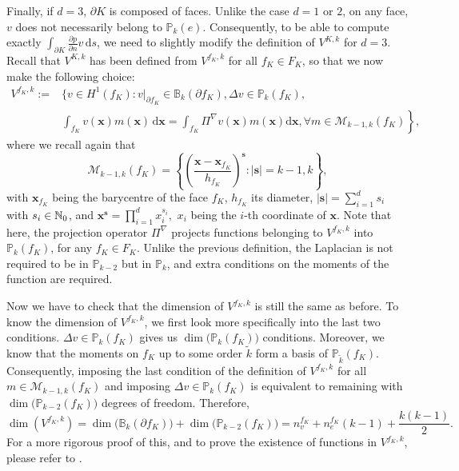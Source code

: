 Finally, if $d=3$, $\partial K$ is composed of faces. Unlike the case $d=1$ or $2$, on any face, $v$ does not necessarily belong to $\mathbb{P}_k(e)$. Consequently, to be able to compute exactly $\int_{\partial K} \frac{\partial p}{\partial n} v \, \mathrm{d}s$, we need to  slightly modify the definition of $V^{K,k}$ for $d=3$. Recall that $V^{K,k}$ has been defined from $V^{f_K,k}$ for all $f_K\in F_K$, so that we now make the following choice:
\begin{align*}
V^{f_K,k} := &\Bigg\{v\in H^1(f_K) : v|_{\partial f_K} \in \mathbb{B}_k(\partial f_K), \Delta v\in \mathbb{P}_{k}(f_K), \\
&\left. \int_{f_K} v(\mathbf{x}) m(\mathbf{x}) \, \mathrm{d}\mathbf{x} = \int_{f_K} \Pi^\nabla v(\mathbf{x}) m(\mathbf{x})\mathrm{d}\mathbf{x}, \forall m\in\mathcal{M}_{k-1,k}(f_K) \right\},
\end{align*}
where we recall again that $$\mathcal{M}_{k-1,k}(f_K) = \left\{\left(\frac{\mathbf{x}- \mathbf{x}_{f_K}}{h_{f_K}}\right)^\mathbf{s} : |\mathbf{s}|= k-1, k\right\},$$ with $\mathbf{x}_{f_K}$ being the barycentre of the face $f_K$, $h_{f_K}$ its diameter, $|\mathbf{s}| = \sum_{i=1}^d s_i$ with $s_i\in \mathbb{N}_0$, and $\mathbf{x}^\mathbf{s}=\prod_{i=1}^d x_i^{s_i},$ $x_i$ being the $i$-th coordinate of $\mathbf{x}$. Note that here, the projection operator $\Pi^\nabla$ projects functions belonging to $V^{f_K,k}$ into $\mathbb{P}_k(f_K)$, for any $f_K\in F_K$. 
Unlike the previous definition, the Laplacian is not required to be in $\mathbb{P}_{k-2}$ but in $\mathbb{P}_k$, and extra conditions on the moments of the function are required.

Now we have to check that the dimension of $V^{f_K,k}$ is still the same as before. 
To know the dimension of $V^{f_K,k}$, we first look more specifically into the last two conditions. $\Delta v\in\mathbb{P}_k(f_K)$ gives us $\dim\big(\mathbb{P}_k(f_K)\big)$ conditions. Moreover, we know that the moments on $f_K$ up to some order $\tilde{k}$ form a basis of $\mathbb{P}_{\tilde{k}}(f_K)$. Consequently, imposing the last condition of the definition of $V^{f_K,k}$ for all $m\in\mathcal{M}_{k-1,k}(f_K)$ and imposing $\Delta v\in\mathbb{P}_k(f_K)$ is equivalent to remaining with $\dim\big(\mathbb{P}_{k-2}(f_K)\big)$ degrees of freedom. Therefore, 
$$\dim\left(V^{f_K,k}\right) = \dim\big(\mathbb{B}_k\left(\partial f_K\right)\big)+\dim\big(\mathbb{P}_{k-2}(f_K)\big)= n_v^{f_K} + n_e^{f_K}(k-1) + \frac{k(k-1)}{2}.$$
For a more rigorous proof of this, and to prove the existence of functions in $V^{f_K,k}$, please refer to \cite{existenceW}. 

